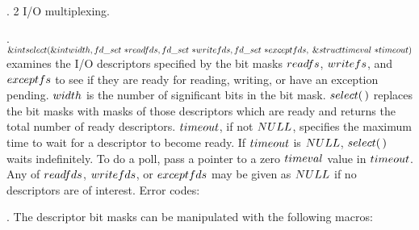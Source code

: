 \fi

. 2 I/O multiplexing.

\fi

. \CD{}$\&{int}\ \\{select}(\&{int}\ \\{width},\;\\{fd\_set}\ {{*}}%
\\{readfds},\;\\{fd\_set}\ {{*}}\\{writefds},\;\\{fd\_set}\ {{*}}\\{exceptfds},%
\;\&{struct}\ \\{timeval}\ {*}\\{timeout})$\DC{} examines the I/O descriptors
specified
by the bit masks \CD{}$\\{readfs}$\DC{}, \CD{}$\\{writefs}$\DC{}, and \CD{}$%
\\{exceptfs}$\DC{} to see if they are ready for
reading, writing, or have an exception pending. \CD{}$\\{width}$\DC{} is the
number of significant
bits in the bit mask. \CD{}$\\{select}(\,)$\DC{} replaces the bit masks with
masks of those descriptors
which are ready and returns the total number of ready descriptors. \CD{}$%
\\{timeout}$\DC{}, if
not \CD{}$\\{NULL}$\DC{}, specifies the maximum time to wait for a descriptor
to become ready. If
\CD{}$\\{timeout}$\DC{} is \CD{}$\\{NULL}$\DC{}, \CD{}$\\{select}(\,)$\DC{}
waits indefinitely. To do a poll, pass a pointer to
a zero \CD{}$\\{timeval}$\DC{} value in \CD{}$\\{timeout}$\DC{}. Any of \CD{}$%
\\{readfds}$\DC{}, \CD{}$\\{writefds}$\DC{}, or \CD{}$\\{exceptfds}$\DC{}
may be given as \CD{}$\\{NULL}$\DC{} if no descriptors are of interest.
\medskip
Error codes:
\medskip{}

\fi

. The descriptor bit masks can be manipulated with the following macros:

